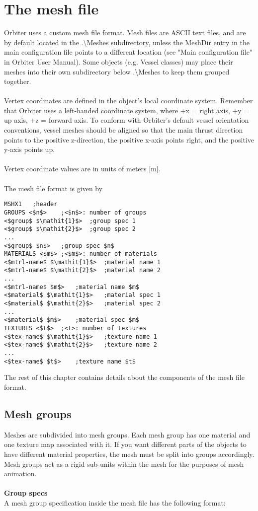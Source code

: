 \documentclass[Orbiter Developer Manual.tex]{subfiles}
\begin{document}
\section{The mesh file}
\label{sec:mesh_file}
Orbiter uses a custom mesh file format. Mesh files are ASCII text files, and are by default located in the .\textbackslash Meshes subdirectory, unless the MeshDir entry in the main configuration file points to a different location (see "Main configuration file" in Orbiter User Manual). Some objects (e.g. Vessel classes) may place their meshes into their own subdirectory below .\textbackslash Meshes to keep them grouped together.\\
\\
Vertex coordinates are defined in the object's local coordinate system. Remember that Orbiter uses a left-handed coordinate system, where +x = right axis, +y = up axis, +z = forward axis. To conform with Orbiter's default vessel orientation conventions, vessel meshes should be aligned so that the main thrust direction points to the positive z-direction, the positive x-axis points right, and the positive y-axis points up.\\
\\
Vertex coordinate values are in units of meters [m].\\
\\
The mesh file format is given by

\begin{lstlisting}[language=OSFS,mathescape=true]
MSHX1	;header
GROUPS <$n$>	;<$n$>: number of groups
<$group$ $\mathit{1}$>	;group spec 1
<$group$ $\mathit{2}$>	;group spec 2
...
<$group$ $n$>	;group spec $n$
MATERIALS <$m$>	;<$m$>: number of materials
<$mtrl-name$ $\mathit{1}$>	;material name 1
<$mtrl-name$ $\mathit{2}$>	;material name 2
...
<$mtrl-name$ $m$>	;material name $m$
<$material$ $\mathit{1}$>	;material spec 1
<$material$ $\mathit{2}$>	;material spec 2
...
<$material$ $m$>	;material spec $m$
TEXTURES <$t$>	;<t>: number of textures
<$tex-name$ $\mathit{1}$>	;texture name 1
<$tex-name$ $\mathit{2}$>	;texture name 2
...
<$tex-name$ $t$>	;texture name $t$
\end{lstlisting}

\noindent
The rest of this chapter contains details about the components of the mesh file format.


\subsection{Mesh groups}
Meshes are subdivided into mesh groups. Each mesh group has one material and one texture map associated with it. If you want different parts of the objects to have different material properties, the mesh must be split into groups accordingly. Mesh groups act as a rigid sub-units within the mesh for the purposes of mesh animation.\\
\\
\textbf{Group specs}\\
A mesh group specification inside the mesh file has the following format:
\end{document}
